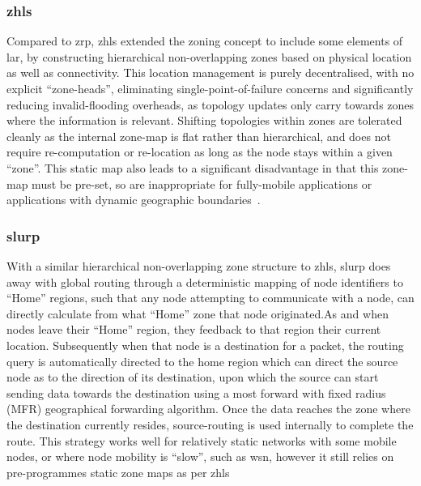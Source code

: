 {\subsubsection{\gls{zhls}}
Compared to \gls{zrp}, \gls{zhls} extended the zoning concept to include some elements of \gls{lar}, by constructing hierarchical non-overlapping zones based on physical location as well as connectivity. This location management is purely decentralised, with no explicit ``zone-heads'', eliminating single-point-of-failure concerns and significantly reducing invalid-flooding overheads, as topology updates only carry towards zones where the information is relevant. Shifting topologies within zones are tolerated cleanly as the internal zone-map is flat rather than hierarchical, and does not require re-computation or re-location as long as the node stays within a given ``zone''. This static map also leads to a significant disadvantage in that this zone-map must be pre-set, so are inappropriate for fully-mobile applications or applications with dynamic geographic boundaries~\cite{Joa-Ng1999,Hamma2006}.

\subsubsection{\gls{slurp}}
With a similar hierarchical non-overlapping zone structure to \gls{zhls}, \gls{slurp} does away with global routing through a deterministic mapping of node identifiers to ``Home'' regions, such that any node attempting to communicate with a node, can directly calculate from what ``Home'' zone that node originated.As and when nodes leave their ``Home'' region, they feedback to that region their current location. Subsequently when that node is a destination for a packet, the routing query is automatically directed to the home region which can direct the source node as to the direction of its destination, upon which the source can start sending data towards the destination using a most forward with fixed radius (MFR) geographical forwarding algorithm. Once the data reaches the zone where the destination currently resides, source-routing is used internally to complete the route. This strategy works well for relatively static networks with some mobile nodes, or where node mobility is ``slow'', such as \gls{wsn}, however it still relies on pre-programmes static zone maps as per \gls{zhls}~\cite{Woo2001}

}
